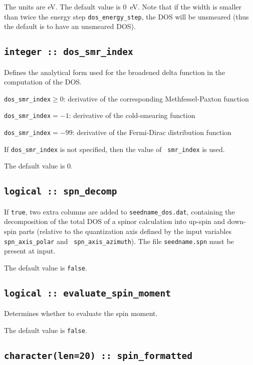 The units are eV. The default value is 0~eV. Note that if the width is
smaller than twice the energy step {\tt dos\_energy\_step}, the DOS
will be unsmeared (thus the default is to have an unsmeared DOS).


\subsection[dos\_smr\_en\_width]{\tt integer :: dos\_smr\_index}

Defines the analytical form used for the broadened delta function in the computation of the DOS.

\hspace{0.5cm}
{\tt dos\_smr\_index}$\geq 0$: derivative of the corresponding Methfessel-Paxton function

\hspace{0.5cm}
{\tt dos\_smr\_index}$= -1$: derivative of the cold-smearing function

\hspace{0.5cm}
{\tt dos\_smr\_index}$= -99$: derivative of the Fermi-Dirac distribution function

If {\tt dos\_smr\_index} is not specified, then the value of {\tt
  smr\_index} is used.  

The default value is 0.

\subsection[evaluate\_spin\_moment]{\tt logical :: spn\_decomp}
If {\tt true}, two extra columns are added to {\tt seedname\_dos.dat},
containing the decomposition of the total DOS of a spinor calculation
into up-spin and down-spin parts (relative to the quantization axis
defined by the input variables {\tt spn\_axis\_polar} and {\tt
  spn\_axis\_azimuth}). The file {\tt seedname.spn} must be present at
input.

The default value is \verb#false#.

\subsection[evaluate\_spin\_moment]{\tt logical :: evaluate\_spin\_moment}
Determines whether to evaluate the spin moment.

The default value is \verb#false#.

\subsection[spin\_formated]{\tt character(len=20) :: spin\_formatted}


